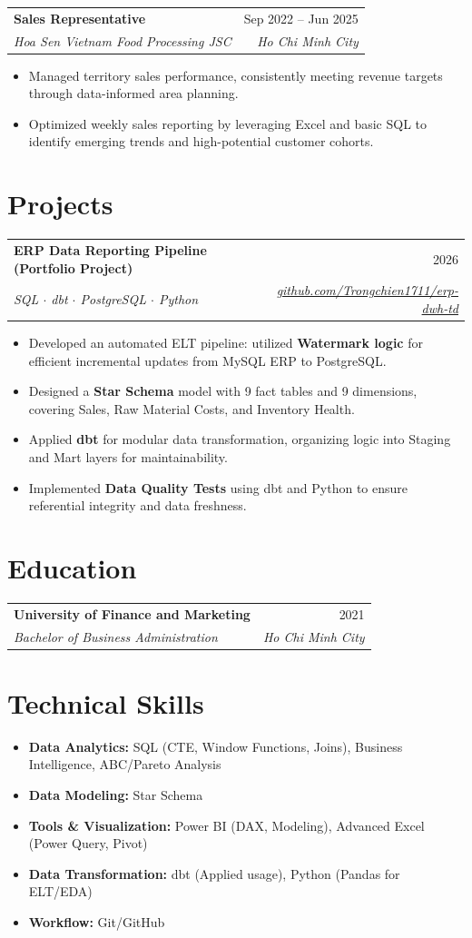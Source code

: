 \documentclass[letterpaper,11pt]{article}
\makeatletter
\newcommand{\resumeItem}[1]{
  \item #1
}
\newcommand{\resumeSubheading}[4]{
  \vspace{2pt}
  \begin{tabular*}{\textwidth}{l@{\extracolsep{\fill}}r}
    \textbf{#1} & #2 \\
    \textit{#3} & \textit{#4}
  \end{tabular*}
}
\makeatother
\begin{document}
\resumeSubheading
{Sales Representative}{Sep 2022 -- Jun 2025}
{Hoa Sen Vietnam Food Processing JSC}{Ho Chi Minh City}

\begin{itemize}
  \resumeItem{Managed territory sales performance, consistently meeting revenue targets through data-informed area planning.}
  \resumeItem{Optimized weekly sales reporting by leveraging Excel and basic SQL to identify emerging trends and high-potential customer cohorts.}
\end{itemize}

\section{Projects}

\resumeSubheading
{ERP Data Reporting Pipeline (Portfolio Project)}{2026}
{SQL $\cdot$ dbt $\cdot$ PostgreSQL $\cdot$ Python}{\href{https://github.com/Trongchien1711/erp-dwh-td}{github.com/Trongchien1711/erp-dwh-td}}

\begin{itemize}
  \resumeItem{Developed an automated ELT pipeline: utilized \textbf{Watermark logic} for efficient incremental updates from MySQL ERP to PostgreSQL.}
  \resumeItem{Designed a \textbf{Star Schema} model with 9 fact tables and 9 dimensions, covering Sales, Raw Material Costs, and Inventory Health.}
  \resumeItem{Applied \textbf{dbt} for modular data transformation, organizing logic into Staging and Mart layers for maintainability.}
  \resumeItem{Implemented \textbf{Data Quality Tests} using dbt and Python to ensure referential integrity and data freshness.}
\end{itemize}

\section{Education}

\resumeSubheading
{University of Finance and Marketing}{2021}
{Bachelor of Business Administration}{Ho Chi Minh City}

\section{Technical Skills}

\begin{itemize}
  \item \textbf{Data Analytics:} SQL (CTE, Window Functions, Joins), Business Intelligence, ABC/Pareto Analysis
  \item \textbf{Data Modeling:} Star Schema
  \item \textbf{Tools \& Visualization:} Power BI (DAX, Modeling), Advanced Excel (Power Query, Pivot)
  \item \textbf{Data Transformation:} dbt (Applied usage), Python (Pandas for ELT/EDA)
  \item \textbf{Workflow:} Git/GitHub
\end{itemize}
\end{document}
